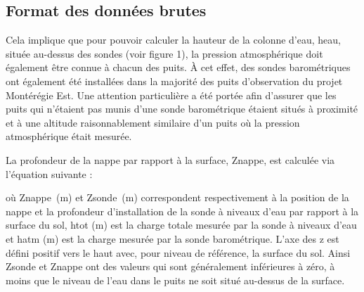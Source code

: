 \documentclass[WHATMANUAL.tex]{subfiles}
\begin{document}
\subsection{Format des données brutes}

Cela implique que pour pouvoir calculer la hauteur de la colonne d'eau, heau, située au-dessus des sondes (voir figure 1), la pression atmosphérique doit également être connue à chacun des puits. À cet effet, des sondes barométriques ont également été installées dans la majorité des puits d'observation du projet Montérégie Est. Une attention particulière a été portée afin d'assurer que les puits qui n'étaient pas munis d'une sonde barométrique étaient situés à proximité et à une altitude raisonnablement similaire d'un puits où la pression atmosphérique était mesurée.

La profondeur de la nappe par rapport à la surface, Znappe, est calculée via l'équation suivante : 

où Znappe (m) et Zsonde (m) correspondent respectivement à la position de la nappe et la profondeur d'installation de la sonde à niveaux d'eau par rapport à la surface du sol, htot (m) est la charge totale mesurée par la sonde à niveaux d'eau et hatm (m) est la charge mesurée par la sonde barométrique. L'axe des z est défini positif vers le haut avec, pour niveau de référence, la surface du sol. Ainsi Zsonde et Znappe ont des valeurs qui sont généralement inférieures à zéro, à moins que le niveau de l'eau dans le puits ne soit situé au-dessus de la surface.
\end{document}
